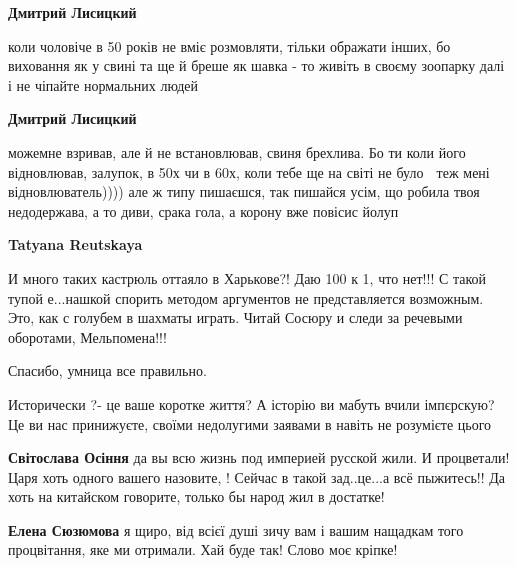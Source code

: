 \begin{itemize}
\begin{itemize}
\textbf{Дмитрий Лисицкий} 

коли чоловіче в 50 років не вміє розмовляти, тільки ображати інших, бо
виховання як у свині та ще й бреше як шавка - то живіть в своєму зоопарку далі
і не чіпайте нормальних людей \Laughey[1.0][white]\Laughey[1.0][white]\Laughey[1.0][white]



\textbf{Дмитрий Лисицкий} 

можемне взривав, але й не встановлював, свиня брехлива. Бо ти коли його
відновлював, залупок, в 50х чи в 60х, коли тебе ще на світі не було 🤣 теж мені
відновлюватель)))) але ж типу пишаєшся, так пишайся усім, що робила твоя
недодержава, а то диви, срака гола, а корону вже повісис йолуп 🤣🤣🤣

\textbf{Tatyana Reutskaya} 

И много таких кастрюль оттаяло в Харькове?! Даю 100
к 1, что нет!!! С такой тупой е...нашкой спорить методом аргументов не
представляется возможным. Это, как с голубем в шахматы играть. Читай Сосюру и
следи за речевыми оборотами, Мельпомена!!!
\end{itemize}

Спасибо, умница все правильно.



Исторически ?- це ваше коротке життя? А історію ви мабуть вчили імпєрскую? Це
ви нас принижуєте, своїми недолугими заявами в навіть не розумієте цього

\begin{itemize}
\textbf{Світослава Осіння} да вы всю жизнь под империей русской жили. И
процветали! Царя хоть одного вашего назовите, ! Сейчас в такой зад..це...а всё
пыжитесь!! Да хоть на китайском говорите, только бы народ жил в достатке!


\textbf{Елена Сюзюмова} я щиро, від всієї душі зичу вам і вашим нащадкам того
процвітання, яке ми отримали. Хай буде так! Слово моє кріпке!
\end{itemize}


\end{itemize}
